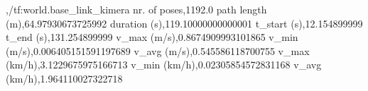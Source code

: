 ,/tf:world.base_link_kimera
nr. of poses,1192.0
path length (m),64.97930673725992
duration (s),119.10000000000001
t_start (s),12.154899999
t_end (s),131.254899999
v_max (m/s),0.8674909993101865
v_min (m/s),0.006405151591197689
v_avg (m/s),0.545586118700755
v_max (km/h),3.1229675975166713
v_min (km/h),0.02305854572831168
v_avg (km/h),1.964110027322718
